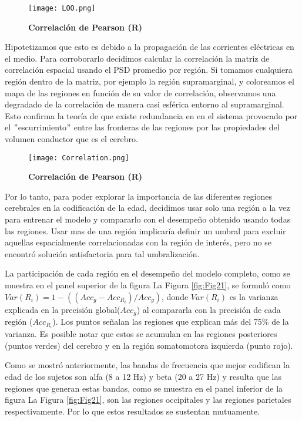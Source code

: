 \documentclass[11pt,letterpaper]{article}
\numberwithin{equation}{subsection}
\numberwithin{table}{subsection}
\begin{document}
\begin{figure}[H]
\centering
	\texttt{[image: LOO.png]}
	\captionsetup{labelfont=bf}
	\caption{\scriptsize \textbf {Correlación de Pearson (R)} }
	\label{fig:Fig20}
\end{figure} 

\bigskip
\noindent Hipotetizamos que esto es debido a la propagación de las corrientes eléctricas en el medio. Para corroborarlo decidimos calcular la correlación la matriz de correlación espacial usando el PSD promedio por región. Si tomamos cualquiera región dentro de la matriz, por ejemplo la región supramarginal, y coloreamos el mapa de las regiones en función de su valor de correlación, observamos una degradado de la correlación de manera casi esférica entorno al supramarginal. Esto confirma la teoría de que existe redundancia en en el sistema provocado por el $"$escurrimiento$"$ entre las fronteras de las regiones por las propiedades del volumen conductor que es el cerebro.

\begin{figure}[H]
\centering
	\texttt{[image: Correlation.png]}
	\captionsetup{labelfont=bf}
	\caption{\scriptsize \textbf {Correlación de Pearson (R)} }
	\label{fig:Fig20}
\end{figure} 

\bigskip
\noindent Por lo tanto, para poder explorar la importancia de las diferentes regiones cerebrales en la codificación de la edad, decidimos usar solo una región a la vez para entrenar el modelo y compararlo con el desempeño obtenido usando todas las regiones. Usar mas de una región implicaría definir un umbral para excluir aquellas espacialmente correlacionadas con la región de interés, pero no se encontró solución satisfactoria para tal umbralización.

\bigskip
\noindent La participación de cada región en el desempeño del modelo completo, como se muestra en el panel superior de la figura La Figura \ref{fig:Fig21}, se formuló como $Var(R_i)=1-((Acc_g-Acc_{R_i})/Acc_g)$, donde $Var(R_i)$ es la varianza explicada en la precisión global($Acc_g$) al compararla con la precisión de cada región ($Acc_{R_i}$). Los puntos señalan las regiones que explican más del 75\% de la varianza. Es posible notar que estos se acumulan en las regiones posteriores (puntos verdes) del cerebro y en la región somatomotora izquierda (punto rojo).  

\bigskip
\noindent Como se mostró anteriormente, las bandas de frecuencia que mejor codifican la edad de los sujetos son alfa (8 a 12 Hz) y beta (20 a 27 Hz) y resulta que las regiones que generan estas bandas, como se muestra en el panel inferior de la figura La Figura \ref{fig:Fig21}, son las regiones occipitales y las regiones parietales respectivamente. Por lo que estos resultados se sustentan mutuamente. 
\end{document}
